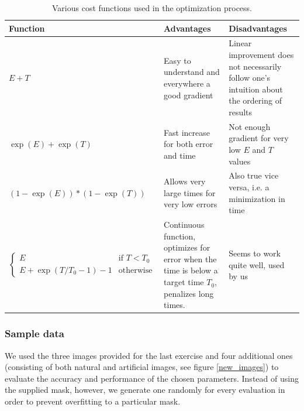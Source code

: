 \documentclass[10pt,conference,compsocconf]{IEEEtran}
\begin{document}
\begin{table}
\centering
{\renewcommand{\arraystretch}{1.5}
\renewcommand{\tabcolsep}{0.2cm}
\begin{tabular}{|l|p{6cm}|p{6cm}|}
\hline
Function & Advantages & Disadvantages \\
\hline
$E + T$ & Easy to understand and everywhere a good gradient & Linear improvement does not necessarily follow one's intuition about the ordering of results \\
\hline
$\exp(E)+\exp(T)$ & Fast increase for both error and time & Not enough gradient for very low $E$ and $T$ values \\
\hline
$(1-\exp(E))*(1-\exp(T))$ & Allows very large times for very low errors & Also true vice versa, i.e. a minimization in time \\
\hline
$ \begin{cases}
E & \text{if }T<T_0\\
E+\exp(T/T_0 - 1) - 1 & \text{otherwise}
\end{cases} $ & Continuous function, optimizes for error when the time is below a target time $T_0$, penalizes long times. & Seems to work quite well, used by us \\
\hline
\end{tabular}}
\caption{Various cost functions used in the optimization process.}
\label{cost_functions}
\end{table}

\subsubsection{Sample data}
We used the three images provided for the last exercise and four additional ones (consisting of both natural and artificial images, see figure \ref{new_images}) to evaluate the accuracy and performance of the chosen parameters. Instead of using the supplied mask, however, we generate one randomly for every evaluation in order to prevent overfitting to a particular mask.
\end{document}
